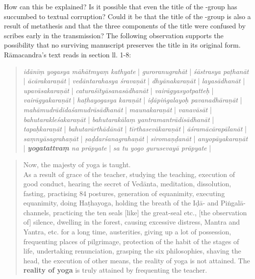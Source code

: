How can this be explained? Is it possible that even the title of the \alpha-group has succumbed to textual corruption? Could it be that the title of the \alpha-group is also a result of metathesis and that the three components of the title were confused by scribes early in the transmission? The following observation supports the possibility that no surviving manuscript preserves the title in its original form. Rāmacandra's text reads in section  ll. 1-8:

\begin{quote}
  \label{mahatmya}
  \textit{idānīṃ yogasya māhātmyaṃ kathyate} |
  \textit{guroranugrahāt} | \textit{śāstrasya paṭhanāt} | \textit{ācārakaraṇāt} | \textit{vedāntarahasya śravaṇāt} |
  \textit{dhyānakaraṇāt} | \textit{layasādhanāt} | \textit{upavāsakaraṇāt} | \textit{caturaśītyāsanasādhanāt} | \textit{vairāgyasyotpatteḥ} | \textit{vairāgyakaraṇāt} | \textit{haṭhayogasya karaṇāt} | \textit{iḍāpiṅgalayoḥ pavanadhāraṇāt} | \textit{mahāmudrādidaśamudrāsādhanāt} | \textit{maunakaraṇāt} | \textit{vanavāsāt} | \textit{bahutarakleśakaraṇāt} | \textit{bahutarakālaṃ} \textit{yantramantrādisādhanāt} | \textit{tapaḥkaraṇāt} | \textit{bahutarārthādānāt} | \textit{tīrthasevākaraṇāt} | \textit{āśramācārapālanāt} | \textit{saṃnyāsagrahaṇāt} | \textit{ṣaḍdarśanagrahaṇāt} | \textit{siromaṇḍanāt} | \textit{anyopāyakaraṇāt} | \textit{\textbf{yogatattvaṃ} na prāpyate} | \textit{sa tu yogo gurusevayā prāpyate} |
\end{quote}

\begin{quote}
  Now, the majesty of yoga is taught.\\
  As a result of grace of the teacher, studying the teaching, execution of good conduct, hearing the secret of Vedānta, meditation, dissolution, fasting, practising 84 postures, generation of equanimity, executing equanimity, doing Haṭhayoga, holding the breath of the Iḍā- and Piṅgalā-channels,  practicing the ten seals [like] the great-seal etc., [the observation of] silence, dwelling in the forest, causing excessive distress, Mantra and Yantra, etc. for a long time, austerities, giving up a lot of possession, frequenting places of pilgrimage, protection of the habit of the stages of life, undertaking renunciation, grasping the six philosophies, shaving the head, the execution of other means, the reality of yoga is not attained. The \textbf{reality of yoga} is truly attained by frequenting the teacher.
  \end{quote}

